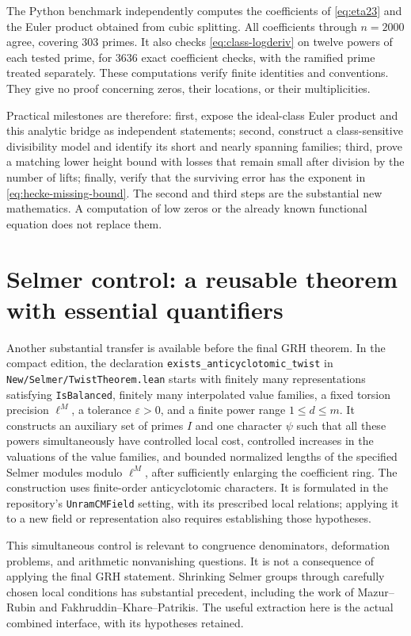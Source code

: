 The Python benchmark independently computes the coefficients of
\eqref{eq:eta23} and the Euler product obtained from cubic splitting.
All coefficients through $n=2000$ agree, covering $303$ primes. It also
checks \eqref{eq:class-logderiv} on twelve powers of each tested prime,
for $3636$ exact coefficient checks, with the ramified prime treated
separately. These computations verify finite identities and conventions.
They give no proof concerning zeros, their locations, or their
multiplicities.

Practical milestones are therefore: first, expose the ideal-class
Euler product and this analytic bridge as independent statements;
second, construct a class-sensitive divisibility model and identify its
short and nearly spanning families; third, prove a matching lower
height bound with losses that remain small after division by the
number of lifts; finally, verify that the surviving error has the
exponent in \eqref{eq:hecke-missing-bound}. The second and third steps
are the substantial new mathematics. A computation of low zeros or
the already known functional equation does not replace them.

\section{Selmer control: a reusable theorem with essential quantifiers}
\label{sec:selmer-transfer}

Another substantial transfer is available before the final GRH theorem.
In the compact edition, the declaration
\texttt{exists\_anticyclotomic\_twist} in
\texttt{New/Selmer/TwistTheorem.lean} starts with finitely many
representations satisfying \texttt{IsBalanced}, finitely many
interpolated value families, a fixed torsion precision $\ell^M$, a
tolerance $\varepsilon>0$, and a finite power range $1\leq d\leq m$.
It constructs an auxiliary set of primes $I$ and one character $\psi$
such that all these powers simultaneously have controlled local cost,
controlled increases in the valuations of the value families, and
bounded normalized lengths of the specified Selmer modules modulo
$\ell^M$, after sufficiently enlarging the coefficient ring.
The construction uses finite-order anticyclotomic characters. It is
formulated in the repository's \texttt{UnramCMField} setting, with its
prescribed local relations; applying it to a new field or representation
also requires establishing those hypotheses.\cite{repo}

This simultaneous control is relevant to congruence denominators,
deformation problems, and arithmetic nonvanishing questions. It is not
a consequence of applying the final GRH statement. Shrinking Selmer
groups through carefully chosen local conditions has substantial
precedent, including the work of Mazur--Rubin and
Fakhruddin--Khare--Patrikis.\cite{mazurRubin,fkp} The useful extraction
here is the actual combined interface, with its hypotheses retained.

